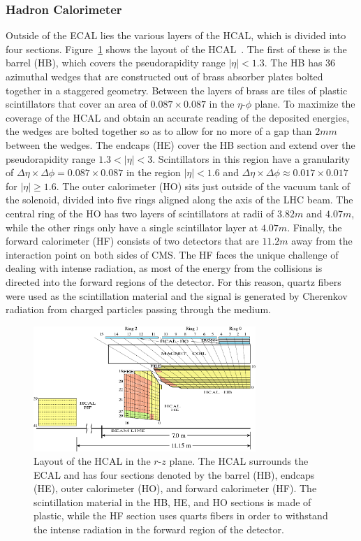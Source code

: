 \subsubsection{Hadron Calorimeter}

Outside of the ECAL lies the various layers of the HCAL, which is divided into four sections.
Figure~\ref{fig:CMSHCAL} shows the layout of the HCAL~\cite{Collaboration_2010_HCAL}.
The first of these is the barrel (HB), which covers the pseudorapidity range $|\eta|<1.3$.
The HB has 36 azimuthal wedges that are constructed out of brass absorber plates bolted together in a staggered geometry.
Between the layers of brass are tiles of plastic scintillators that cover an area of $0.087\times0.087$ in the $\eta$-$\phi$ plane.
To maximize the coverage of the HCAL and obtain an accurate reading of the deposited energies, the wedges are bolted together so as to allow for no more of a gap than $2\unit{mm}$ between the wedges.
The endcaps (HE) cover the HB section and extend over the pseudorapidity range $1.3<|\eta|<3$.
Scintillators in this region have a granularity of $\Delta\eta\times\Delta\phi=0.087\times0.087$ in the region $|\eta|<1.6$ and $\Delta\eta\times\Delta\phi\approx0.017\times0.017$ for $|\eta|\geq1.6$.
The outer calorimeter (HO) sits just outside of the vacuum tank of the solenoid, divided into five rings aligned along the axis of the LHC beam.
The central ring of the HO has two layers of scintillators at radii of $3.82\unit{m}$ and $4.07\unit{m}$, while the other rings only have a single scintillator layer at $4.07\unit{m}$.
Finally, the forward calorimeter (HF) consists of two detectors that are $11.2\unit{m}$ away from the interaction point on both sides of CMS.
The HF faces the unique challenge of dealing with intense radiation, as most of the energy from the collisions is directed into the forward regions of the detector.
For this reason, quartz fibers were used as the scintillation material and the signal is generated by Cherenkov radiation from charged particles passing through the medium.

\begin{figure}[htbp]
  \centering
  \includegraphics[width=0.75\textwidth]{fig/experiment/HCAL-HB-HE-HO-HF.pdf}
  \caption{
    Layout of the HCAL in the $r$-$z$ plane.
    The HCAL surrounds the ECAL and has four sections denoted by the barrel (HB), endcaps (HE), outer calorimeter (HO), and forward calorimeter (HF).
    The scintillation material in the HB, HE, and HO sections is made of plastic, while the HF section uses quarts fibers in order to withstand the intense radiation in the forward region of the detector.
  }
  \label{fig:CMSHCAL}
\end{figure}

